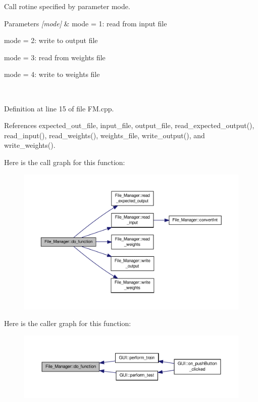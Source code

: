 Call rotine specified by parameter mode. 


\begin{DoxyParams}{Parameters}
{\em \mbox{[}mode\mbox{]}} & mode = 1\-: read from input file\par
 mode = 2\-: write to output file\par
 mode = 3\-: read from weights file\par
 mode = 4\-: write to weights file\par
 \\
\hline
\end{DoxyParams}


Definition at line 15 of file F\-M.\-cpp.



References expected\-\_\-out\-\_\-file, input\-\_\-file, output\-\_\-file, read\-\_\-expected\-\_\-output(), read\-\_\-input(), read\-\_\-weights(), weights\-\_\-file, write\-\_\-output(), and write\-\_\-weights().



Here is the call graph for this function\-:
\nopagebreak
\begin{figure}[H]
\begin{center}
\leavevmode
\includegraphics[width=350pt]{d8/d84/a00001_abcb9cd1427a3b6ecfd41432391ec9bdc_cgraph}
\end{center}
\end{figure}




Here is the caller graph for this function\-:\nopagebreak
\begin{figure}[H]
\begin{center}
\leavevmode
\includegraphics[width=350pt]{d8/d84/a00001_abcb9cd1427a3b6ecfd41432391ec9bdc_icgraph}
\end{center}
\end{figure}


